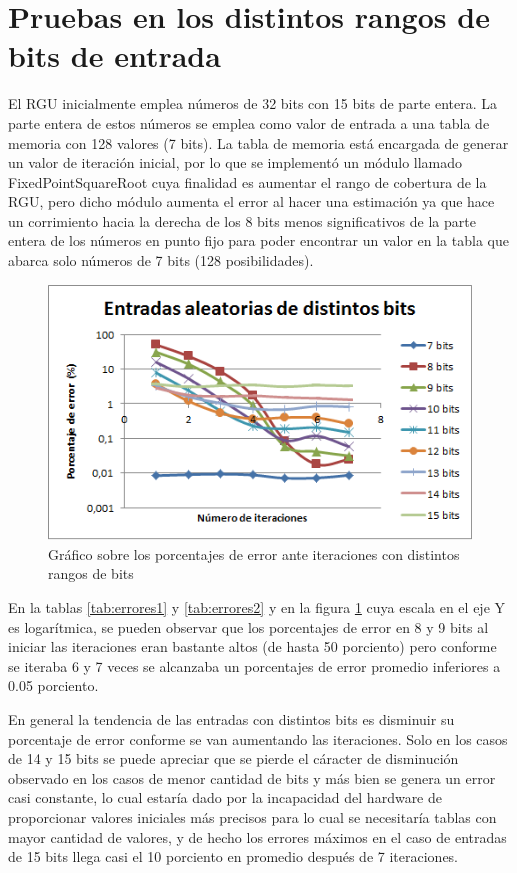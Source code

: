 \section{Pruebas en los distintos rangos de bits de entrada}

El  RGU inicialmente emplea números de 32 bits con 15 bits de parte entera. La parte entera de estos números se emplea como valor de entrada a una tabla de memoria con 128 valores (7 bits). La tabla de memoria está encargada de generar un valor de iteración inicial, por lo que se implementó un módulo llamado FixedPointSquareRoot cuya finalidad es aumentar el rango de cobertura de la RGU, pero dicho módulo aumenta el error al hacer una estimación ya que hace un corrimiento hacia la derecha de los 8 bits menos significativos de la parte entera de los números en punto fijo para poder encontrar un valor en la tabla que abarca solo números de 7 bits (128 posibilidades).

\begin{figure}
	\includegraphics[width=0.7\linewidth]{images/puntos}
	\caption{Gráfico sobre los porcentajes de error ante iteraciones con distintos rangos de bits} \label{fig:puntos}
\end{figure}
En la tablas \ref{tab:errores1} y \ref{tab:errores2} y en la figura \ref{fig:puntos} cuya escala en el eje Y es logarítmica, se pueden observar que los porcentajes de error en 8 y 9 bits al iniciar las iteraciones eran bastante altos (de hasta 50 porciento) pero conforme se iteraba 6 y 7 veces se alcanzaba un porcentajes de error promedio inferiores a 0.05 porciento. 

En general la tendencia de las entradas con distintos bits es disminuir su porcentaje de error conforme se van aumentando las iteraciones. Solo en los casos de 14 y 15 bits se puede apreciar que se pierde el cáracter de disminución observado en los casos de menor cantidad de bits y más bien se genera un error casi constante, lo cual estaría dado por la incapacidad del hardware de proporcionar valores iniciales más precisos para lo cual se necesitaría tablas con mayor cantidad de valores, y de hecho los errores máximos en el caso de entradas de 15 bits llega casi el 10 porciento en promedio después de 7 iteraciones.
 
